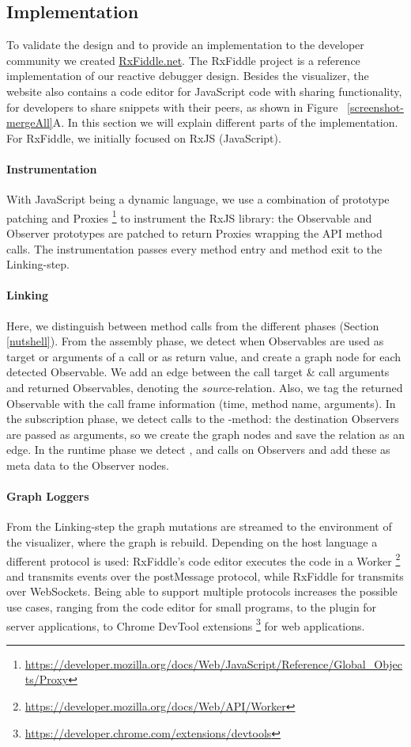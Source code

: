 \subsection{Implementation} To validate the design and to provide an
implementation to the developer community we created \url{RxFiddle.net}.
The RxFiddle project is a reference implementation of our reactive
debugger design.  Besides the visualizer, the website also contains a
code editor for JavaScript code with sharing functionality, for
developers to share snippets with their peers, as shown in Figure~%
\ref{screenshot-mergeAll}A.  In this section we will explain different
parts of the implementation.  For RxFiddle, we initially focused on RxJS
(JavaScript).

\paragraph{Instrumentation} With JavaScript being a dynamic language, we
use a combination of prototype patching and Proxies%
\footnote{\url{https://developer.mozilla.org/docs/Web/JavaScript/Reference/Global_Objects/Proxy}}
to instrument the RxJS library:  the Observable and Observer prototypes
are patched to return Proxies wrapping the API method calls.  The
instrumentation passes every method entry and method exit to the
Linking-step.

\paragraph{Linking} Here, we distinguish between method calls from the
different phases (Section~%
\ref{nutshell}).  From the assembly phase, we detect when Observables
are used as target or arguments of a call or as return value, and create
a graph node for each detected Observable.  We add an edge between the
call target \& call arguments and returned Observables, denoting the
\emph{source}-relation.  Also, we tag the returned Observable with the
call frame information (time, method name, arguments).  In the
subscription phase, we detect calls to the -method:  the
destination Observers are passed as arguments, so we create the graph
nodes and save the relation as an edge.  In the runtime phase we detect
,  and  calls on Observers and add
these as meta data to the Observer nodes.

\paragraph{Graph Loggers} From the Linking-step the graph mutations are
streamed to the environment of the visualizer, where the graph is
rebuild.  Depending on the host language a different protocol is used:
RxFiddle's code editor executes the code in a Worker%
\footnote{\url{https://developer.mozilla.org/docs/Web/API/Worker}} and
transmits events over the postMessage protocol, while RxFiddle for
\NodeJS{} transmits over WebSockets.  Being able to support multiple
protocols increases the possible use cases, ranging from the code editor
for small programs, to the \NodeJS{} plugin for server applications, to
Chrome DevTool extensions%
\footnote{\url{https://developer.chrome.com/extensions/devtools}} for
web applications.


